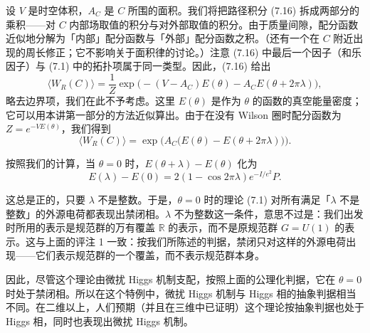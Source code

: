 设 $V$ 是时空体积，$A_C$ 是 $C$ 所围的面积。我们将把路径积分 (7.16) 拆成两部分的乘积——对 $C$ 内部场取值的积分与对外部取值的积分。由于质量间隙，配分函数近似地分解为「内部」配分函数与「外部」配分函数之积。（还有一个在 $C$ 附近出现的周长修正；它不影响关于面积律的讨论。）注意 (7.16) 中最后一个因子（和乐因子）与 (7.1) 中的拓扑项属于同一类型。因此，(7.16) 给出
\begin{equation}
  \tag{7.17}
  \label{eq:7-17}
  \langle W_R(C)\rangle=\frac{1}{Z}\exp\bigl(-(V-A_C)E(\theta)-A_C E(\theta+2\pi\lambda)\bigr) ,
\end{equation}
略去边界项，我们在此不予考虑。这里 $E(\theta)$ 是作为 $\theta$ 的函数的真空能量密度；它可以用本讲第一部分的方法近似算出。由于在没有 Wilson 圈时配分函数为 $Z=e^{-VE(\theta)}$，我们得到
\begin{equation}
  \tag{7.18}
  \label{eq:7-18}
  \langle W_R(C)\rangle=\exp\bigl(A_C\bigl(E(\theta)-E(\theta+2\pi\lambda)\bigr)\bigr) .
\end{equation}

按照我们的计算，当 $\theta=0$ 时，$E(\theta+\lambda)-E(\theta)$ 化为
\begin{equation}
  \tag{7.19}
  \label{eq:7-19}
  E(\lambda)-E(0)=2(1-\cos2\pi\lambda)e^{-I/e^2}P .
\end{equation}


这总是正的，只要 $\lambda$ 不是整数。于是，$\theta=0$ 时的理论 (7.1) 对所有满足「$\lambda$ 不是整数」的外源电荷都表现出禁闭相。$\lambda$ 不为整数这一条件，意思不过是：我们出发时所用的表示是规范群的万有覆盖 $\mathbb{R}$ 的表示，而不是原规范群 $G=U(1)$ 的表示。这与上面的评注 1 一致：按我们所陈述的判据，禁闭只对这样的外源电荷出现——它们表示规范群的一个覆盖，而不表示规范群本身。

因此，尽管这个理论由微扰 Higgs 机制支配，按照上面的公理化判据，它在 $\theta=0$ 时处于禁闭相。所以在这个特例中，微扰 Higgs 机制与 Higgs 相的抽象判据相当不同。在二维以上，人们预期（并且在三维中已证明）这个理论按抽象判据也处于 Higgs 相，同时也表现出微扰 Higgs 机制。

